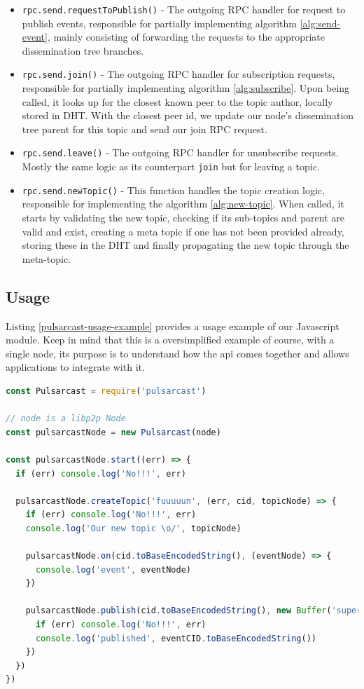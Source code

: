 \begin{itemize}
  \item
    \verb|rpc.send.requestToPublish()| - The outgoing RPC handler for request to publish events, responsible for partially implementing algorithm \ref{alg:send-event}, mainly consisting of forwarding the requests to the appropriate dissemination tree branches.
  \item
    \verb|rpc.send.join()| - The outgoing RPC handler for subscription requests, responsible for partially implementing algorithm \ref{alg:subscribe}. Upon being called, it looks up for the closest known peer to the topic author, locally stored in DHT. With the closest peer id, we update our node's dissemination tree parent for this topic and send our join RPC request.
  \item
    \verb|rpc.send.leave()| - The outgoing RPC handler for unsubscribe requests. Mostly the same logic as its counterpart \verb|join| but for leaving a topic.
  \item
    \verb|rpc.send.newTopic()| - This function handles the topic creation logic, responsible for implementing the algorithm \ref{alg:new-topic}.  When called, it starts by validating the new topic, checking if its sub-topics and parent are valid and exist, creating a meta topic if one has not been provided already, storing these in the DHT and finally propagating the new topic through the meta-topic.
\end{itemize}

\subsection{Usage}\label{subsec:usage}

Listing \ref{pulsarcast-usage-example} provides a usage example of our
Javascript module. Keep in mind that this is a oversimplified example of
course, with a single node, its purpose is to understand how the \acrshort{api} comes
together and allows applications to integrate with it.

\begin{lstlisting}[language=JavaScript, float=h, caption={Usage example of our Pulsarcast module},label={pulsarcast-usage-example}]
const Pulsarcast = require('pulsarcast')

// node is a libp2p Node
const pulsarcastNode = new Pulsarcast(node)

const pulsarcastNode.start((err) => {
  if (err) console.log('No!!!', err)
  
  pulsarcastNode.createTopic('fuuuuun', (err, cid, topicNode) => {
    if (err) console.log('No!!!', err)
    console.log('Our new topic \o/', topicNode)
    
    pulsarcastNode.on(cid.toBaseEncodedString(), (eventNode) => {
      console.log('event', eventNode)
    })
    
    pulsarcastNode.publish(cid.toBaseEncodedString(), new Buffer('super fun!'), (err, eventCID) => {
      if (err) console.log('No!!!', err)
      console.log('published', eventCID.toBaseEncodedString())
    })
  })
})
\end{lstlisting}

